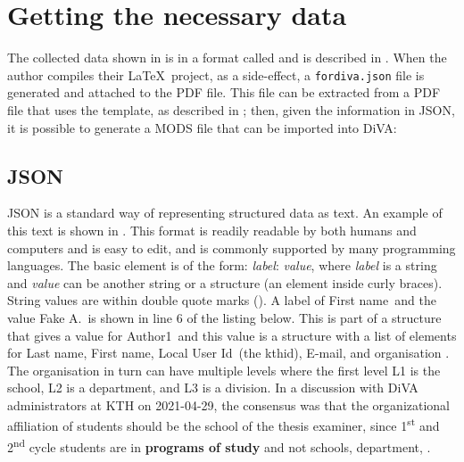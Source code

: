 \documentclass[12pt, twoside]{article}
\newcommand{\fname}[1]{\texttt{#1}}
\begin{document}
\section{Getting the necessary data}
\label{sec:gettingNecessaryData}
The collected data shown in  is in a format called  and is described in . 
When the author compiles their \LaTeX~project, as a side-effect, a \fname{fordiva.json} file is generated and attached to the \gls{PDF} file.
This file can be extracted from a \gls{PDF} file that uses the template, as described in ; then, given the information in \gls{JSON}, it is possible to generate a \gls{MODS} file that can be imported into \gls{DiVA}:


\subsection {JSON}
\label{sec:json}
JSON is a standard way of representing structured data as text. An example of this text is shown in . This format is \first readily readable by both humans and computers and \Second is easy to edit, and \third is commonly supported by many programming languages. The basic element is of the form: \textit{label}: \textit{value}, where \textit{label} is a string and \textit{value} can be another string or a structure (an element inside curly braces). String values are within double quote marks (\ie \textquotedbl). A label of \textquotedbl First name\textquotedbl\  and the value \textquotedbl Fake A.\textquotedbl~is shown in line 6 of the listing below. This is part of a structure that gives a value for \textquotedbl Author1\textquotedbl~and this value is a structure with a list of elements for \textquotedbl Last name\textquotedbl, \textquotedbl First name\textquotedbl, \textquotedbl Local User Id\textquotedbl~(\ie the kthid), \textquotedbl E-mail\textquotedbl, and \textquotedbl organisation \textquotedbl. The organisation in turn can have multiple levels where the first level L1 is the school, L2 is a department, and L3 is a division. In a discussion with \gls{DiVA} administrators at \gls{KTH} on 2021-04-29, the consensus was that the organizational affiliation of students should be the school of the thesis examiner, since 1\textsuperscript{st} and 2\textsuperscript{nd} cycle students are in \textbf{programs of study} and not schools, department, \etc.
\end{document}
